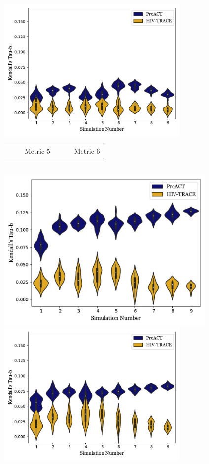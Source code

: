 \documentclass{article}
\begin{document}
\begin{center}
\vspace{0.1in}
\includegraphics[trim=0.8in 0.55in 0 0,clip,width=3.72in]{m4_tau.pdf}\\
\begin{tabular*}{5in}{@{\extracolsep{\fill}}cc}
\vspace{-0.05in}
{\Large~~~~~Metric 5}&{\Large~~~~~Metric 6}\\
\end{tabular*}\\
\includegraphics[trim=0 0.55in 0 0,clip,width=4.25in]{m5_tau.pdf}
\includegraphics[trim=0.8in 0.55in 0 0,clip,width=3.72in]{m6_tau.pdf}\\

\end{center}
\end{document}
